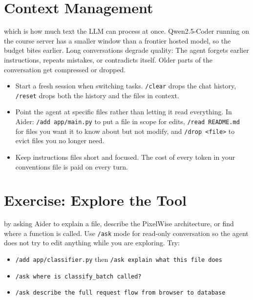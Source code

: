 \section{Context Management}

 which is how much text the LLM can process at
once. Qwen2.5-Coder running on the course server has a smaller window than a frontier hosted model,
so the budget bites earlier. Long conversations degrade quality: The agent forgets earlier
instructions, repeats mistakes, or contradicts itself. Older parts of the conversation get
compressed or dropped.

\begin{itemize}
    \item Start a fresh session when switching tasks. \texttt{/clear} drops the chat history,
    \texttt{/reset} drops both the history and the files in context.
    \item Point the agent at specific files rather than letting it read everything. In Aider:
    \texttt{/add app/main.py} to put a file in scope for edits, \texttt{/read README.md} for files
    you want it to know about but not modify, and \texttt{/drop <file>} to evict files you no longer
    need.
    \item Keep instructions files short and focused. The cost of every token in your conventions
    file is paid on every turn.
\end{itemize}


\newpage
\section{Exercise: Explore the Tool}

 by asking Aider to explain a file, describe
the PixelWise architecture, or find where a function is called. Use \texttt{/ask} mode for
read-only conversation so the agent does not try to edit anything while you are exploring. Try:

\begin{itemize}
    \item \texttt{/add app/classifier.py} then \texttt{/ask explain what this file does}
    \item \texttt{/ask where is classify\_batch called?}
    \item \texttt{/ask describe the full request flow from browser to database}
\end{itemize}

